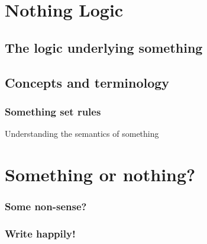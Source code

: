 	
\section{Nothing Logic}
\label{sec:notlogic}
	
		\subsection{The logic underlying something}
		\label{subsec:logicunderlying}
    	
    	
    	
		\subsection{Concepts and terminology}
		\label{subsec:conceptsterm}	
		
    	\subsubsection*{Something set rules}

    	Understanding the semantics of something

\section{Something or nothing?}
\label{sec:someornot}

	\subsubsection{Some non-sense?}
	
    	
    	
    \subsubsection{Write happily!}
    	
    	
    	
    